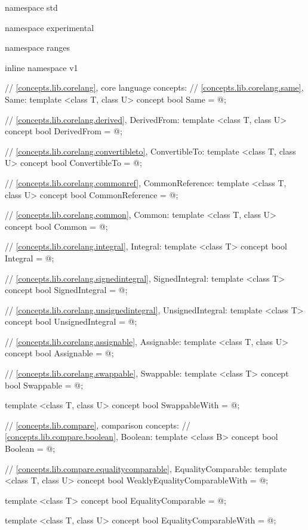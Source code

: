 %
\begin{codeblock}
namespace std { namespace experimental { namespace ranges { inline namespace v1 {
  // \ref{concepts.lib.corelang}, core language concepts:
  // \ref{concepts.lib.corelang.same}, Same:
  template <class T, class U>
  concept bool Same = @\seebelow@;

  // \ref{concepts.lib.corelang.derived}, DerivedFrom:
  template <class T, class U>
  concept bool DerivedFrom = @\seebelow@;

  // \ref{concepts.lib.corelang.convertibleto}, ConvertibleTo:
  template <class T, class U>
  concept bool ConvertibleTo = @\seebelow@;

  // \ref{concepts.lib.corelang.commonref}, CommonReference:
  template <class T, class U>
  concept bool CommonReference = @\seebelow@;

  // \ref{concepts.lib.corelang.common}, Common:
  template <class T, class U>
  concept bool Common = @\seebelow@;

  // \ref{concepts.lib.corelang.integral}, Integral:
  template <class T>
  concept bool Integral = @\seebelow@;

  // \ref{concepts.lib.corelang.signedintegral}, SignedIntegral:
  template <class T>
  concept bool SignedIntegral = @\seebelow@;

  // \ref{concepts.lib.corelang.unsignedintegral}, UnsignedIntegral:
  template <class T>
  concept bool UnsignedIntegral = @\seebelow@;

  // \ref{concepts.lib.corelang.assignable}, Assignable:
  template <class T, class U>
  concept bool Assignable = @\seebelow@;

  // \ref{concepts.lib.corelang.swappable}, Swappable:
  template <class T>
  concept bool Swappable = @\seebelow@;

  template <class T, class U>
  concept bool SwappableWith = @\seebelow@;

  // \ref{concepts.lib.compare}, comparison concepts:
  // \ref{concepts.lib.compare.boolean}, Boolean:
  template <class B>
  concept bool Boolean = @\seebelow@;

  // \ref{concepts.lib.compare.equalitycomparable}, EqualityComparable:
  template <class T, class U>
  concept bool WeaklyEqualityComparableWith = @\seebelow@;

  template <class T>
  concept bool EqualityComparable = @\seebelow@;

  template <class T, class U>
  concept bool EqualityComparableWith = @\seebelow@;

}}}}
\end{codeblock}
